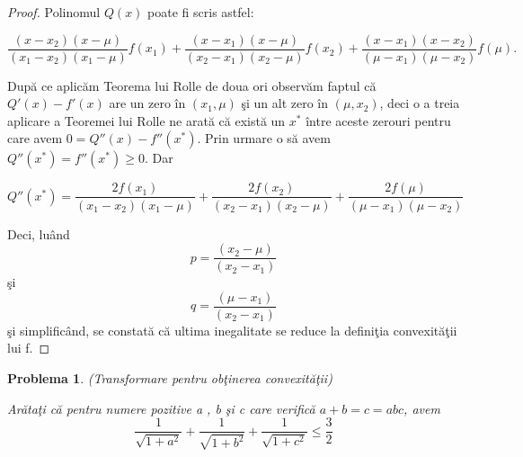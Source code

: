 \documentclass[a4paper,12pt,oneside]{report}
\newtheorem{problem}{Problema}
\begin{document}
\begin{proof}
Polinomul \(Q\left ( x \right )\) poate fi scris astfel:

\begin{displaymath}
  \frac{\left ( x - x_{2} \right )\left ( x - \mu  \right )}{\left ( x_{1}  - x_{2}\right )\left ( x_{1} - \mu  \right )} f\left ( x_{1} \right ) + \frac{\left ( x - x_{1} \right )\left ( x - \mu  \right )}{\left ( x_{2}  - x_{1}\right )\left ( x_{2} - \mu  \right )}  f\left ( x_{2} \right ) +  \frac{\left ( x - x_{1} \right )\left ( x - x_{2}  \right )}{\left ( \mu   - x_{1}\right )\left (  \mu - x_{2} \right )}f\left ( \mu \right ).
\end{displaymath}

Dup\u{a} ce aplic\u{a}m Teorema lui Rolle de doua ori observ\u{a}m faptul c\u{a}  \({Q}'\left ( x \right ) - {f}'\left ( x \right )\) are un zero \^{i}n \(\left ( x_{1} , \mu \right )\) \c{s}i un alt zero \^{i}n \(\left ( \mu  , x_{2} \right )\), deci o a treia aplicare a Teoremei lui Rolle ne arat\u{a} c\u{a} exist\u{a} un \(x^{*}\) \^{i}ntre aceste zerouri pentru care avem \(0 = {Q}''\left ( x \right ) - {f}''\left ( x^{*} \right )\). Prin urmare o s\u{a} avem \({Q}''\left ( x^{*}  \right ) = {f}''\left ( x^{*} \right )\geq 0\). Dar

\begin{displaymath}
  {Q}''\left ( x^{*}  \right ) = \frac{2f\left ( x_{1} \right )}{\left ( x_{1} - x_{2} \right )\left ( x_{1} - \mu  \right )} +  \frac{2f\left ( x_{2} \right )}{\left ( x_{2} - x_{1} \right )\left ( x_{2} - \mu  \right )} +  \frac{2f\left (\mu  \right )}{\left ( \mu  - x_{1} \right )\left ( \mu  - x_{2} \right )}
\end{displaymath}

Deci, lu\^{a}nd
\begin{displaymath}
  p = \frac{\left ( x_{2} - \mu  \right )}{\left ( x_{2} - x_{1}\right )}
\end{displaymath}
\c{s}i
\begin{displaymath}
  q = \frac{\left ( \mu  - x_{1} \right )}{\left ( x_{2} - x_{1} \right )}
\end{displaymath}
\c{s}i simplific\^{a}nd, se constat\u{a} c\u{a} ultima inegalitate se reduce la defini\c{t}ia convexit\u{a}\c{t}ii lui f.
\end{proof}
\begin{problem} (Transformare pentru ob\c{t}inerea convexit\u{a}\c{t}ii)

Ar\u{a}ta\c{t}i c\u{a} pentru numere pozitive a , b \c{s}i c care verific\u{a} \(a + b = c = abc\), avem
\begin{displaymath}
  \frac{1}{\sqrt{1 + a^{2}}} + \frac{1}{\sqrt{1 + b^{2}}} + \frac{1}{\sqrt{1 + c^{2}}} \leq \frac{3}{2}
\end{displaymath}
\end{problem}
\end{document}
